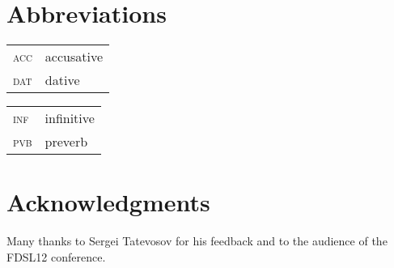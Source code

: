 \documentclass[output=paper]{langscibook}
\begin{document}
\section*{Abbreviations}

\begin{tabularx}{.5\textwidth}{@{}lQ@{}}
\textsc{acc}&accusative\\
\textsc{dat}&dative\\
\end{tabularx}%
\begin{tabularx}{.5\textwidth}{@{}lQ@{}}
\textsc{inf}&infinitive\\
\textsc{pvb}&preverb\\
\end{tabularx}

\section*{Acknowledgments}
Many thanks to Sergei Tatevosov for his feedback and to the audience of the FDSL12 conference.

\sloppy
\printbibliography[heading=subbibliography,notkeyword=this]
\end{document}

